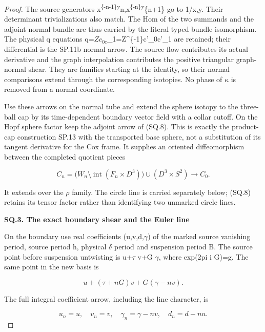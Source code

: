 \begin{proof}
The source generators x\textsuperscript{\{-n-1\}y}n,x\textsuperscript{\{-n\}y}\{n+1\} go to 1/x,y.
Their determinant trivializations also match. The Hom of the two
summands and the adjoint normal bundle are thus carried by the
literal typed bundle isomorphism. The physical q equations
q=\(Zc_{0c}\)\_1=Z\^{}\{-1\}c'\_0c'\_1 are retained; their differential is the
SP.11b normal arrow. The source flow contributes its actual derivative
and the graph interpolation contributes the positive triangular
graph-normal shear. They are families starting at the identity, so
their normal comparisons extend through the corresponding isotopies.
No phase of \(\kappa\) is removed from a normal coordinate.

Use these arrows on the normal tube and extend the sphere isotopy to
the three-ball cap by its time-dependent boundary vector field with
a collar cutoff. On the Hopf sphere factor keep the adjoint arrow
of (SQ.8). This is exactly the product-cap construction SP.13 with
the transported base sphere, not a substitution of its tangent
derivative for the Cox frame. It supplies an oriented diffeomorphism
between the completed quotient pieces

\[
 C_n=\bigl(W_n\setminus\operatorname{int}(F_n\times D^3)\bigr)
                      \cup(D^3\times S^2)
                 \longrightarrow C_0 .                 \tag{SQ.9}
\]

It extends over the \(\rho\) family. The circle line is carried separately
below; (SQ.8) retains its tensor factor rather than identifying two
unmarked circle lines.

\par

\medskip\noindent\textbf{SQ.3. The exact boundary shear and the Euler line}

\par\nobreak

On the boundary use real coefficients (u,v,d,\(\gamma\)) of the marked
source vanishing period, source period h, physical \(\delta\) period and
suspension period B. The source point before suspension untwisting is
u+\(\tau\) v+G \(\gamma\), where exp(2pi i G)=g. The same point in the new
basis is

\[
 u+(\tau+nG)v+G(\gamma-nv).
\]

The full integral coefficient arrow, including the line character,
is

\[
 u_n=u,\quad v_n=v,\quad
 \gamma_n=\gamma-nv,\quad d_n=d-nu.                   \tag{SQ.10}
\]


\end{proof}
